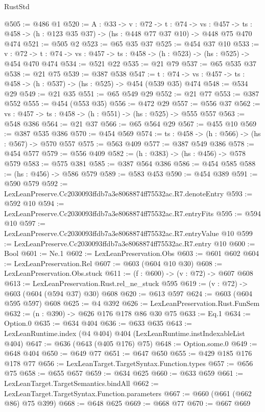 \begin{lexlean}{RustStd}
\begin{coremodule}
@505 := @486 @1
@520 := {A : @33} ->
  {v : @72} ->
  {t : @74} ->
  {vs : @457} -> {ts : @458} -> (h : @123 @35 @37) -> (hs : @448 @77 @37 @10) -> @448 @75 @470 @474
@521 := @505 @2
@523 := @65 @35 @37
@525 := @454 @37 @10
@533 := {v : @72} ->
  {t : @74} -> {vs : @457} -> {ts : @458} -> (h : @523) -> (hs : @525) -> @454 @470 @474
@534 := @521 @22
@535 := @21 @79
@537 := @65 @535 @37
@538 := @21 @75
@539 := @387 @538
@547 := {t : @74} -> {vs : @457} -> {ts : @458} -> (h : @537) -> (hs : @525) -> @454 (@539 @35) @474
@548 := @534 @29
@549 := @21 @35
@551 := @65 @549 @29
@552 := @21 @77
@553 := @387 @552
@555 := @454 (@553 @35)
@556 := @472 @29
@557 := @556 @37
@562 := {vs : @457} -> {ts : @458} -> (h : @551) -> (hs : @525) -> @555 @557
@563 := @548 @386
@564 := @21 @37
@566 := @65 @564 @29
@567 := @455 @10
@569 := @387 @535 @386
@570 := @454 @569
@574 := {ts : @458} -> (h : @566) -> (hs : @567) -> @570 @557
@575 := @563 @409
@577 := @387 @549 @386
@578 := @454 @577
@579 := @556 @409
@582 := (h : @383) -> (hs : @456) -> @578 @579
@583 := @575 @381
@585 := @387 @564 @386
@586 := @454 @585
@588 := (hs : @456) -> @586 @579
@589 := @583 @453
@590 := @454 @389
@591 := @590 @579
@592 := LexLeanPreserve.Cc2030093ffdb7a3e8068874ff75532ac.R7.denoteEntry
@593 := @592 @10
@594 := LexLeanPreserve.Cc2030093ffdb7a3e8068874ff75532ac.R7.entryFits
@595 := @594 @10
@597 := LexLeanPreserve.Cc2030093ffdb7a3e8068874ff75532ac.R7.entryValue @10
@599 := LexLeanPreserve.Cc2030093ffdb7a3e8068874ff75532ac.R7.entry @10
@600 := Bool
@601 := Ne.{1}
@602 := LexLeanPreservation.Obs
@603 := @601 @602
@604 := LexLeanPreservation.Rel
@607 := @603 (@604 @10 @30)
@608 := LexLeanPreservation.Obs.stuck
@611 := (f : @600) -> (v : @72) -> @607 @608
@613 := LexLeanPreservation.Rust.rel_ne_stuck @595
@619 := (v : @72) -> @603 (@604 (@594 @37) @30) @608
@620 := @613 @597
@624 := @603 (@604 @595 @597) @608
@625 := @4 @392
@626 := LexLeanPreservation.Rust.FunSem
@632 := (n : @390) -> @626 @176 @178 @86 @30 @75
@633 := Eq.{1}
@634 := Option.{0}
@635 := @634 @404
@636 := @633 @635
@643 := LexLeanRuntime.index (@4 @404) @404 (LexLeanRuntime.instIndexableList @404)
@647 := @636 (@643 (@405 @176) @75)
@648 := Option.some.{0}
@649 := @648 @404
@650 := @649 @77
@651 := @647 @650
@655 := @429 @185 @176 @178 @77
@656 := LexLeanTarget.TargetSyntax.Function.types
@657 := @656 @75
@658 := @655 @657
@659 := @634 @625
@660 := @633 @659
@661 := LexLeanTarget.TargetSemantics.bindAll
@662 := LexLeanTarget.TargetSyntax.Function.parameters
@667 := @660 (@661 (@662 @86) @75 @399)
@668 := @648 @625
@669 := @668 @77
@670 := @667 @669

\end{coremodule}
\end{lexlean}

